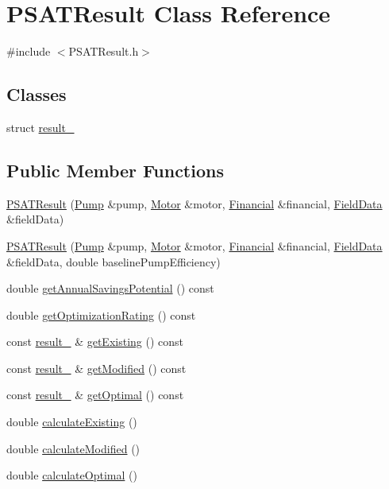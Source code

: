 \hypertarget{class_p_s_a_t_result}{}\section{P\+S\+A\+T\+Result Class Reference}
\label{class_p_s_a_t_result}


{\ttfamily \#include $<$P\+S\+A\+T\+Result.\+h$>$}

\subsection*{Classes}
\begin{DoxyCompactItemize}
\item 
struct \hyperlink{struct_p_s_a_t_result_1_1result__}{result\+\_\+}
\end{DoxyCompactItemize}
\subsection*{Public Member Functions}
\begin{DoxyCompactItemize}
\item 
\hyperlink{class_p_s_a_t_result_af6f9d5dbd3a6aac3d7e5e212e3a40487}{P\+S\+A\+T\+Result} (\hyperlink{class_pump}{Pump} \&pump, \hyperlink{class_motor}{Motor} \&motor, \hyperlink{class_financial}{Financial} \&financial, \hyperlink{class_field_data}{Field\+Data} \&field\+Data)
\item 
\hyperlink{class_p_s_a_t_result_a89db10b4bcc52985fbb36e8c5afce2ab}{P\+S\+A\+T\+Result} (\hyperlink{class_pump}{Pump} \&pump, \hyperlink{class_motor}{Motor} \&motor, \hyperlink{class_financial}{Financial} \&financial, \hyperlink{class_field_data}{Field\+Data} \&field\+Data, double baseline\+Pump\+Efficiency)
\item 
double \hyperlink{class_p_s_a_t_result_a14fc75c2e0e92f74e3df1b97ed13b496}{get\+Annual\+Savings\+Potential} () const
\item 
double \hyperlink{class_p_s_a_t_result_aa0a7001461408fcb06a6c22ce2d064db}{get\+Optimization\+Rating} () const
\item 
const \hyperlink{struct_p_s_a_t_result_1_1result__}{result\+\_\+} \& \hyperlink{class_p_s_a_t_result_a4da660959f368bdf0951728c9c5f931b}{get\+Existing} () const
\item 
const \hyperlink{struct_p_s_a_t_result_1_1result__}{result\+\_\+} \& \hyperlink{class_p_s_a_t_result_ae43bb3b001e2746292d0dd0d6cebcfdd}{get\+Modified} () const
\item 
const \hyperlink{struct_p_s_a_t_result_1_1result__}{result\+\_\+} \& \hyperlink{class_p_s_a_t_result_af587235430371a05799c60e81aa8dfad}{get\+Optimal} () const
\item 
double \hyperlink{class_p_s_a_t_result_a594e019e535fb402d6d0441d50f8b697}{calculate\+Existing} ()
\item 
double \hyperlink{class_p_s_a_t_result_afbb68257a28c1b853d26faf3227461cc}{calculate\+Modified} ()
\item 
double \hyperlink{class_p_s_a_t_result_a25d50cd89b326f18449496a56d54f472}{calculate\+Optimal} ()
\end{DoxyCompactItemize}


